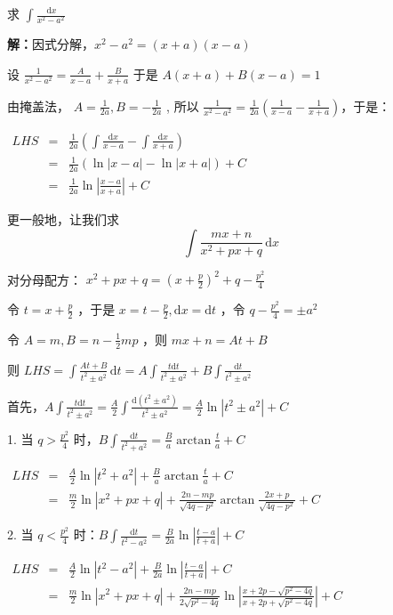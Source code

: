 \begin{example}{}
求 $\displaystyle{\int \frac{\,\mathrm{d}x}{x^2-a^2}}$

\textbf{解：}因式分解，\(x^2-a^2=(x+a)(x-a)\)

设 $\displaystyle{\frac{1}{x^2-a^2}=\frac{A}{x-a}+\frac{B}{x+a}}$ 于是 \(A(x+a)+B(x-a)=1\)

由掩盖法， $\displaystyle{A=\frac{1}{2a},B=-\frac{1}{2a}}$ , 所以 $\displaystyle{\frac{1}{x^2-a^2}=\frac{1}{2a}\left(\frac{1}{x-a}-\frac{1}{x+a} \right)}$，于是：

$\begin{eqnarray*}
LHS&=&\frac{1}{2a}\left(\int\frac{\mathrm{d}x}{x-a}-\int\frac{\mathrm{d}x}{x+a}\right)\\&=&\frac{1}{2a}\left(\ln|x-a|-\ln|x+a|\right)+C \\&=&\frac{1}{2a}\ln\left|\frac{x-a}{x+a}\right|+C
\end{eqnarray*}$

更一般地，让我们求
$$\int\frac{mx+n}{x^2+px+q}\,\mathrm{d}x$$

对分母配方： $\displaystyle{x^2+px+q=\left(x+\frac{p}{2}\right)^2+q-\frac{p^2}{4}}$

令 $\displaystyle{t=x+\frac{p}{2}}$ ，于是 $\displaystyle{x=t-\frac{p}{2},\mathrm{d}x=\mathrm {d}t}$ ，令 $\displaystyle{q-\frac{p^2}{4}=\pm a^2}$

令 $\displaystyle{A=m,B=n-\frac{1}{2}mp}$ ，则 \(mx+n=At+B\)

则 $\displaystyle{LHS=\int\frac{At+B}{t^2\pm a^2}\,\mathrm{d}t =A\int\frac{t\mathrm{d}t}{t^2\pm a^2}+B\int\frac{\mathrm{d}t}{t^2\pm a^2}}$

首先，$\displaystyle{A\int\frac{t\mathrm{d}t}{t^2\pm a^2}=\frac{A}{2}\int\frac{\mathrm{d}\left(t^2\pm a^2\right)}{t^2\pm a^2}=\frac{A}{2}\ln\left|t^2\pm a^2\right|+C}$

1. 当 $\displaystyle{q>\frac{p^2}{4}}$ 时，$\displaystyle{B\int\frac{\mathrm{d}t}{t^2+ a^2}=\frac{B}{a}\arctan{\frac{t}{a}}+C}$

$\begin{eqnarray*}LHS&=&\frac{A}{2}\ln\left|t^2+ a^2\right|+\frac{B}{a}\arctan{\frac{t}{a}}+C \\&=&\frac{m}{2}\ln\left|x^2+px+q\right|+\frac{2n-mp}{\sqrt{4q-p^2}}\arctan{\frac{2x+p}{\sqrt{4q-p^2}}}+C \end{eqnarray*}$

2. 当 $\displaystyle{q<\frac{p^2}{4}}$ 时：$\displaystyle{B\int\frac{\mathrm{d}t}{t^2- a^2}=\frac{B}{2a}\ln\left|\frac{t-a}{t+a}\right|+C}$ 

$\begin{eqnarray*} LHS&=&\frac{A}{2}\ln\left|t^2- a^2\right|+\frac{B}{2a}\ln\left|\frac{t-a}{t+a}\right|+C \\&=&\frac{m}{2}\ln\left|x^2+px+q\right|+\frac{2n-mp}{2\sqrt{p^2-4q}}\ln\left|\frac{x+2p-\sqrt{p^2-4q}}{x+2p+\sqrt{p^2-4q}}\right|+C \end{eqnarray*}$
\end{example}
